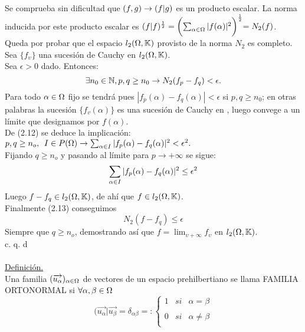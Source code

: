 Se comprueba sin dificultad que  $(f,g) \rightarrow (f | g)$ es un producto escalar. La norma inducida por este producto escalar es $(f|f)^\frac{1}{2}=\biggl( \sum_{\alpha \in \Omega}|f(\alpha )|^2 \biggl)^\frac{1}{2}=N_2 (f)$.\\
Queda por probar que el espacio $l_2 (\Omega , \mathbb{K})$ provisto de la norma $N_2$ es completo. \\
Sea $\lbrace f_\upsilon \rbrace$ una sucesión de Cauchy en $l_2 (\Omega , \mathbb{K})$. \\
Sea $\epsilon >0$ dado. Entonces:
\begin{equation}
\exists n_0 \in \mathbb{N}, p, q \geq n_0 \rightarrow N_2 (f_p - f_q) < \epsilon.
\end{equation}
Para todo $\alpha \in \Omega$ fijo se tendrá pues $|f_p (\alpha)-f_q(\alpha) | < \epsilon$ si $p,q \geq n_0$; en otras palabras la sucesión $\lbrace f_v (\alpha ) \rbrace$ es una sucesión de Cauchy en \K , luego convege a un límite que designamos por $f(\alpha)$. \\
De (2.12) se deduce la implicación: \\
$p,q \geq n_o, \phantom{s} I \in P( \Omega)\rightarrow \sum_{\alpha \in I}|f_p(\alpha)-f_q(\alpha)|^2 < \epsilon^2.$\\
Fijando $q \geq n_o$ y pasando al límite para $p \to +\infty$ se sigue: \\
\begin{equation}
 \sum_{\alpha \in I}|f_p(\alpha)-f_q(\alpha)|^2 \leq \epsilon^2
\end{equation}
Luego $f-f_q \in l_2 (\Omega ,\mathbb{K})$, de ahí que $f \in l_2 (\Omega ,\mathbb{K})$. \\
Finalmente (2.13) conseguimos 
$$
N_2 (f-f_q) \leq \epsilon
$$
Siempre que $q \geq n_o$, demostrando así que $f=\lim_{\upsilon + \infty} f_\upsilon$ en $l_2 (\Omega , \mathbb{K})$.  \\
\phantom{sssssssssssssssssssssssssssssssssss sasdasdasdasdadadssada} c. q. d \\ \\
\underline{Definición.} \\
Una familia $(\overrightarrow{u_{\alpha}})_{\alpha \in \Omega}$ de vectores de un espacio prehilbertiano se llama FAMILIA ORTONORMAL si $\forall \alpha, \beta \in \Omega$ 
\begin{equation*}
(\overrightarrow{u_{\alpha}}|\overrightarrow{u_{\beta}}= \delta_{\alpha \beta}=:  \left\{ \begin{array}{lcc}
           1 & si & \alpha=\beta \\
             \\  0 & si & \alpha \neq \beta \\
             \end{array}
   \right.
\end{equation*}

